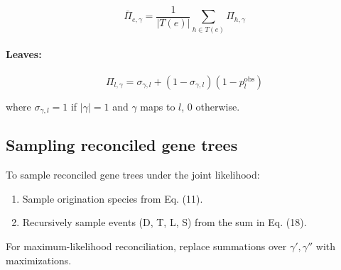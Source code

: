 \[
\bar{\Pi}_{e,\gamma} = \frac{1}{|T(e)|} \sum_{h \in T(e)} \Pi_{h,\gamma}
\]

\paragraph{Leaves:}
\[
\Pi_{l,\gamma} = \sigma_{\gamma,l} + (1 - \sigma_{\gamma,l})(1 - p^{\text{obs}}_l)
\]

where $\sigma_{\gamma,l} = 1$ if $|\gamma| = 1$ and $\gamma$ maps to $l$, 0 otherwise.

\subsection{Sampling reconciled gene trees}

To sample reconciled gene trees under the joint likelihood:
\begin{enumerate}
  \item Sample origination species from Eq. (11).
  \item Recursively sample events (D, T, L, S) from the sum in Eq. (18).
\end{enumerate}

For maximum-likelihood reconciliation, replace summations over $\gamma', \gamma''$ with maximizations.
